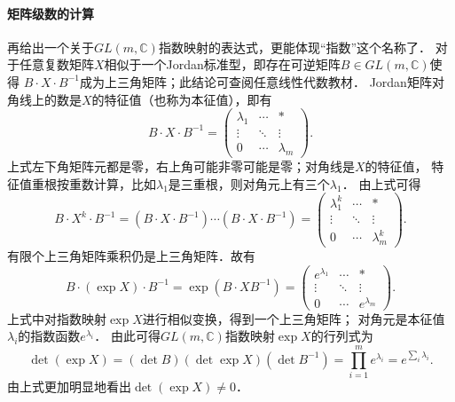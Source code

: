 \paragraph{矩阵级数的计算}
再给出一个关于$GL(m,\mathbb{C})$指数映射的表达式，更能体现“指数”这个名称了．
对于任意复数矩阵$X$相似于一个Jordan标准型，即存在可逆矩阵$B\in GL(m,\mathbb{C})$使得
$B\cdot X \cdot B^{-1}$成为上三角矩阵；此结论可查阅任意线性代数教材．
Jordan矩阵对角线上的数是$X$的特征值（也称为本征值），即有
\begin{equation}
    B\cdot X \cdot B^{-1} = 
    \begin{pmatrix}
        \lambda_1 & \cdots &*\\
        \vdots & \ddots &\vdots \\
        0 &\cdots & \lambda_m
    \end{pmatrix}.
\end{equation}
上式左下角矩阵元都是零，右上角可能非零可能是零；对角线是$X$的特征值，
特征值重根按重数计算，比如$\lambda_1$是三重根，则对角元上有三个$\lambda_1$．
由上式可得
\begin{equation*}
    B\cdot X^k \cdot B^{-1} = 
    (B\cdot X \cdot B^{-1})\cdots (B\cdot X \cdot B^{-1})=
    \begin{pmatrix}
        \lambda_1^k & \cdots &*\\
        \vdots & \ddots &\vdots \\
        0 &\cdots & \lambda_m^k
    \end{pmatrix} .
\end{equation*}
有限个上三角矩阵乘积仍是上三角矩阵．故有
\begin{equation}\label{chlg:eqn_BexpXB}
    B\cdot (\exp X) \cdot B^{-1} = \exp(B\cdot X B^{-1})=
    \begin{pmatrix}
        e^{\lambda_1} & \cdots &*\\
        \vdots & \ddots &\vdots \\
        0 &\cdots & e^{\lambda_m}
    \end{pmatrix}.
\end{equation}
上式中对指数映射$\exp X$进行相似变换，得到一个上三角矩阵；
对角元是本征值$\lambda_i$的指数函数$e^{\lambda_i}$．
由此可得$GL(m,\mathbb{C})$指数映射$\exp X$的行列式为
\begin{equation}\label{chlg:eqn_detexpX}
    \det (\exp X) = (\det B) (\det \exp X) (\det B^{-1})
    = \prod_{i=1}^m e^{\lambda_i} = e^{\sum_i {\lambda_i}} .
\end{equation}
由上式更加明显地看出$\det (\exp X) \neq 0$．

